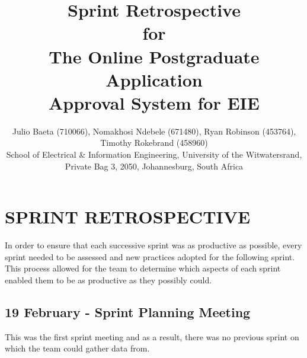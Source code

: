 \documentclass[journal,comsoc,onecolumn]{IEEEtran}
\begin{document}

\title{Sprint Retrospective \\ \vspace{7mm} for \\ \vspace{7mm} The Online Postgraduate Application \\ Approval System for EIE}

\author{\vspace{3mm} Julio Baeta (710066), Nomakhosi Ndebele (671480), Ryan Robinson (453764), Timothy Rokebrand (458960)\\ \small \vspace{2mm} School of Electrical \& Information Engineering, University of the Witwatersrand, Private Bag 3, 2050, Johannesburg, South Africa}

\markboth{}{}

\maketitle

\thispagestyle{empty}


\newpage

\thispagestyle{empty}

\section{SPRINT RETROSPECTIVE}


In order to ensure that each successive sprint was as productive as possible, every sprint needed to be assessed and new practices adopted for the following sprint. This process allowed for the team to determine which aspects of each sprint enabled them to be as productive as they possibly could.


\subsection{19 February - Sprint Planning Meeting}
This was the first sprint meeting and as a result, there was no previous sprint on which the team could gather data from.
\end{document}
